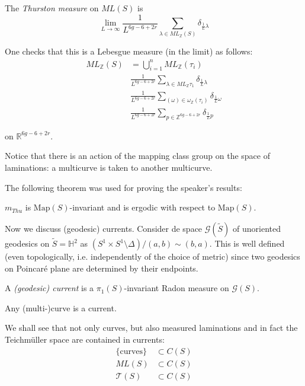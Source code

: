 \begin{definition}
\label{definition-thurston-measure}
The {\it Thurston measure} on $ML(S)$ is
$$
\lim_{L\to\infty}\frac{1}{L^{6g-6+2r}}
\sum_{\lambda
\in ML_{\mathbb{Z}}(S)}
\delta_{\frac{1}{L}\lambda}
$$
\end{definition}

\noindent
One checks that this is a Lebesgue measure
(in the limit) as follows:
$$
\begin{aligned}
ML_{\mathbb{Z}}(S)&=\bigcup_{i=1}
^nML_{\mathbb{Z}}(\tau_i)\\
&\frac{1}{L^{6g-6+2r}}\sum_{\lambda \in
ML_{\mathbb{Z}}\tau_1}
\delta_{\frac{1}{L}\lambda}\\
&\frac{1}{L^{6g-6+2r}}\sum_{(\omega)\in
\omega_{\mathbb{Z}}(\tau_i)}
\delta_{\frac{1}{L}\omega}\\
&\frac{1}{L^{6g-6+2r}}\sum_{p \in
\mathbb{Z}^{6g-6+2r}}
\delta_{\frac{1}{L}p}
\end{aligned}
$$

\noindent
on $\mathbb{R}^{6g-6+2r}$.

Notice that there is an action of the mapping
class group
on the space of laminations: a multicurve is
taken to another multicurve.

The following theorem was used for proving
the speaker's results:

\begin{theorem}[Masur '85]
\label{theorem-masur-85}
$m_{Thu}$ is $\text{Map}(S)$-invariant
and is ergodic with respect to
$\text{Map}(S)$.
\end{theorem}

\medskip\noindent
Now we discuss (geodesic) currents.
Consider de space $\mathcal{G}(\tilde{S})$
of unoriented geodesics on
$\tilde{S}=\mathbb{H}^2$
as $(S^1\times S^1\setminus\Delta)/(a,b)\sim
(b,a)$.
This  is well defined (even topologically,
i.e.
independently of the choice of metric)
since two geodesics on Poincaré plane are
determined by their endpoints.

\begin{definition}
\label{definition-geodesic-current}
A {\it (geodesic) current} is a
$\pi_1(S)$-invariant
Radon measure on $\mathcal{G}(S)$.
\end{definition}

\begin{example}
\label{example-multicurves-are-currents}
Any (multi-)curve is a current.
\end{example}

\noindent
We shall see that not only curves, but also
measured laminations
and in fact the Teichmüller space are
contained in currents:
$$
\begin{aligned}
\{\text{curves}\}&\subset C(S)\\
ML(S)&\subset C(S)\\
\mathcal{T}(S)&\subset C(S)
\end{aligned}
$$

